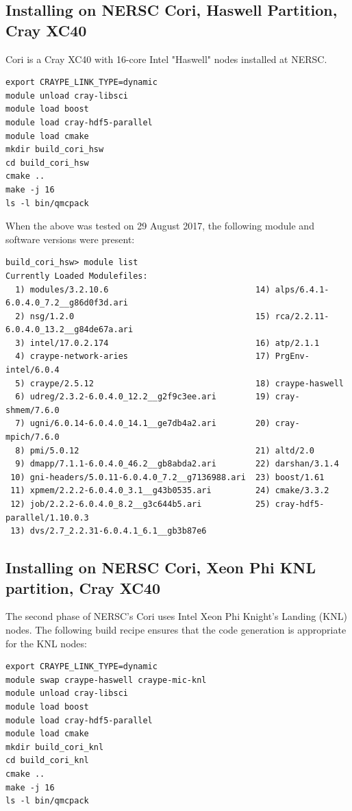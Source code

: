 \subsection{Installing on NERSC Cori, Haswell Partition, Cray XC40}
Cori is a Cray XC40 with 16-core Intel "Haswell" nodes
installed at NERSC.

\begin{verbatim}
export CRAYPE_LINK_TYPE=dynamic
module unload cray-libsci  
module load boost  
module load cray-hdf5-parallel
module load cmake
mkdir build_cori_hsw
cd build_cori_hsw
cmake ..
make -j 16
ls -l bin/qmcpack
\end{verbatim}

When the above was tested on 29 August 2017, the following module and
software versions were present:

\begin{verbatim}
build_cori_hsw> module list
Currently Loaded Modulefiles:
  1) modules/3.2.10.6                              14) alps/6.4.1-6.0.4.0_7.2__g86d0f3d.ari
  2) nsg/1.2.0                                     15) rca/2.2.11-6.0.4.0_13.2__g84de67a.ari
  3) intel/17.0.2.174                              16) atp/2.1.1
  4) craype-network-aries                          17) PrgEnv-intel/6.0.4
  5) craype/2.5.12                                 18) craype-haswell
  6) udreg/2.3.2-6.0.4.0_12.2__g2f9c3ee.ari        19) cray-shmem/7.6.0
  7) ugni/6.0.14-6.0.4.0_14.1__ge7db4a2.ari        20) cray-mpich/7.6.0
  8) pmi/5.0.12                                    21) altd/2.0
  9) dmapp/7.1.1-6.0.4.0_46.2__gb8abda2.ari        22) darshan/3.1.4
 10) gni-headers/5.0.11-6.0.4.0_7.2__g7136988.ari  23) boost/1.61
 11) xpmem/2.2.2-6.0.4.0_3.1__g43b0535.ari         24) cmake/3.3.2
 12) job/2.2.2-6.0.4.0_8.2__g3c644b5.ari           25) cray-hdf5-parallel/1.10.0.3
 13) dvs/2.7_2.2.31-6.0.4.1_6.1__gb3b87e6
\end{verbatim}

\subsection{Installing on NERSC Cori, Xeon Phi KNL partition, Cray XC40}
The second phase of NERSC's Cori uses Intel
Xeon Phi Knight's Landing (KNL) nodes. The following build recipe ensures that the code
generation is appropriate for the KNL nodes:

\begin{verbatim}
export CRAYPE_LINK_TYPE=dynamic
module swap craype-haswell craype-mic-knl  
module unload cray-libsci  
module load boost  
module load cray-hdf5-parallel
module load cmake
mkdir build_cori_knl
cd build_cori_knl
cmake ..
make -j 16
ls -l bin/qmcpack
\end{verbatim}

